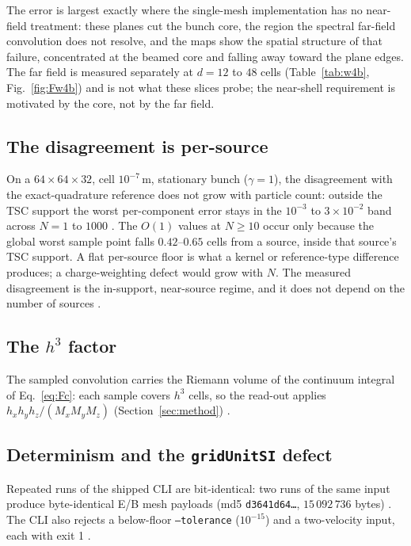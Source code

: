The error is largest exactly where the single-mesh implementation has no
near-field treatment: these planes cut the bunch core, the region the
spectral far-field convolution does not resolve, and the maps show the
spatial structure of that failure, concentrated at the beamed core and
falling away toward the plane edges. The far field is measured separately
at $d=12$ to $48$ cells (Table~\ref{tab:w4b}, Fig.~\ref{fig:Fw4b}) and is
not what these slices probe; the near-shell requirement is motivated by the
core, not by the far field.

\subsection{The disagreement is per-source}

On a $64\times64\times32$, cell $10^{-7}$\,m, stationary bunch ($\gamma=1$),
the disagreement with the exact-quadrature reference does not grow with
particle count: outside the TSC support the worst per-component error stays
in the $10^{-3}$ to $3\times10^{-2}$ band across $N=1$ to $1000$
\citep{W7t}. The $O(1)$ values at $N\ge10$ occur only because the global
worst sample point falls $0.42$--$0.65$ cells from a source, inside that
source's TSC support. A flat per-source floor is what a kernel or
reference-type difference produces; a charge-weighting defect would grow with
$N$. The measured disagreement is the in-support, near-source regime, and it
does not depend on the number of sources \citep{W7t}.

\subsection{The $h^{3}$ factor}

The sampled convolution carries the Riemann volume of the continuum integral
of Eq.~\eqref{eq:Fc}: each sample covers $h^3$ cells, so the read-out applies
$h_x h_y h_z/(M_x M_y M_z)$ (Section~\ref{sec:method}) \citep{S1-spec}.

\subsection{Determinism and the \texttt{gridUnitSI} defect}

Repeated runs of the shipped CLI are bit-identical: two runs of the same
input produce byte-identical E/B mesh payloads (md5 \texttt{d3641d64\ldots},
$15\,092\,736$ bytes) \citep{W4b}. The CLI also rejects a below-floor
\texttt{--tolerance} ($10^{-15}$) and a two-velocity input, each with exit 1
\citep{W4b}.

